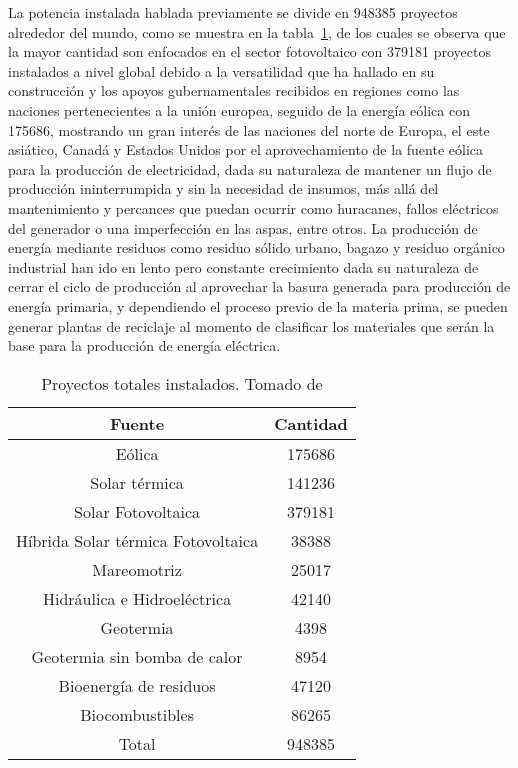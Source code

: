 La potencia instalada hablada previamente se divide en 948385 proyectos alrededor del mundo, como se muestra en la tabla~\ref{tab:proyren}, de los cuales se observa que la mayor cantidad son enfocados en el sector fotovoltaico con 379181 proyectos instalados a nivel global debido a la versatilidad que ha hallado en su construcción y los apoyos gubernamentales recibidos en regiones como las naciones pertenecientes a la unión europea, seguido de la energía eólica con 175686, mostrando un gran interés de las naciones del norte de Europa, el este asiático, Canadá y Estados Unidos por el aprovechamiento de la fuente eólica para la producción de electricidad, dada su naturaleza de mantener un flujo de producción ininterrumpida y sin la necesidad de insumos, más allá del mantenimiento y percances que puedan ocurrir como huracanes, fallos eléctricos del generador o una imperfección en las aspas, entre otros. La producción de energía mediante residuos como residuo sólido urbano, bagazo y residuo orgánico industrial han ido en lento pero constante crecimiento dada su naturaleza de cerrar el ciclo de producción al aprovechar la basura generada para producción de energía primaria, y dependiendo el proceso previo de la materia prima, se pueden generar plantas de reciclaje al momento de clasificar los materiales que serán la base para la producción de energía eléctrica.

\begin{table}[h]
    \centering
    \caption{Proyectos totales instalados. \linebreak Tomado de \textcite{irenahighlight2022}}
    \label{tab:proyren}
    \begin{tabular}{cc}
        \hline
        Fuente                             & Cantidad \\
        \hline
        Eólica                             & 175686   \\
        Solar térmica                      & 141236   \\
        Solar Fotovoltaica                 & 379181   \\
        Híbrida Solar térmica Fotovoltaica & 38388    \\
        Mareomotriz                        & 25017    \\
        Hidráulica e Hidroeléctrica        & 42140    \\
        Geotermia                          & 4398     \\
        Geotermia sin bomba de calor       & 8954     \\
        Bioenergía de residuos             & 47120    \\
        Biocombustibles                    & 86265    \\
        Total                              & 948385   \\
        \hline
    \end{tabular}
\end{table}


